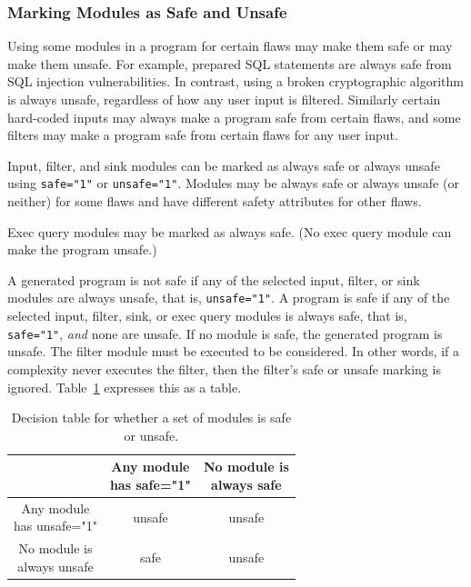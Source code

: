 \subsubsection{Marking Modules as Safe and Unsafe}
\label{sec:safe or unsafe}

Using some modules in a program for certain flaws may make them safe or may make them
unsafe.  For example, prepared SQL statements are always safe from SQL injection
vulnerabilities.  In contrast, using a broken cryptographic algorithm is always
unsafe, regardless of how any user input is filtered.  Similarly certain
hard-coded inputs may always make a program safe from certain flaws, and some filters
may make a program safe from certain flaws for any user input.

Input, filter, and sink modules can be marked as always safe or always unsafe using
\linebreak %
\verb|safe="1"| or \verb|unsafe="1"|.  Modules may be always safe or always unsafe
(or neither) for some flaws and have different safety attributes for other
flaws.

Exec query modules may be marked as always safe.  (No exec query module can make the
program unsafe.)

A generated program is not safe if any of the selected input, filter, or sink modules
are always unsafe, that is, \verb|unsafe="1"|.  A program is safe if any of the
selected input, filter, sink, or exec query modules is always safe, that is,
\verb|safe="1"|, \emph{and} none
are unsafe.  If no module is safe, the generated program is unsafe.
The filter module must be executed to be considered.  In other words, if
a complexity never executes the filter, then the filter's safe or unsafe marking is
ignored.  Table~\ref{tab:selection safe algorithm} expresses this as a table.

\begin{table}[H]
\centering
\caption{Decision table for whether a set of modules is safe or unsafe.}
\begin{tabular}{c|c|c|}
  & \makecell{Any module \\ has safe="1"}
  & \makecell{No module is \\ always safe} \\
\hline
\makecell{Any module \\ has unsafe="1"}  & unsafe & unsafe \\
\hline
\makecell{No module is \\ always unsafe} &   safe   & unsafe \\
\hline
\end{tabular}
\label{tab:selection safe algorithm}
\end{table}

